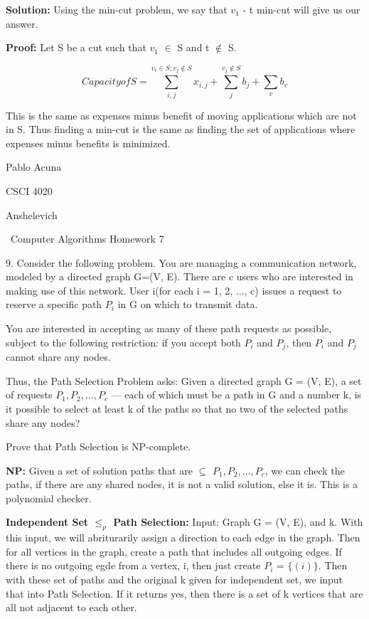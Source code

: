 \documentclass{article}
\begin{document}
\textbf{Solution:} Using the min-cut problem, we say that $v_1$ - t min-cut will give us
our answer.

\textbf{Proof:} Let S be a cut such that $v_1$ $\in$ S and t $\notin$ S.

 $$Capacity of S = \sum_{i,j}^{v_i \in S; v_j \notin S} x_{i,j}  +  \sum_{j}^{v_j \notin S} b_{j} + \sum_{v}^{} b_{v} $$


 This is the same as expenses minus benefit of moving applications which are not in S.
 Thus finding a min-cut is the same as finding the set of applications where
 expenses minus benefits is minimized.



\clearpage


Pablo Acuna

CSCI 4020

Anshelevich

{\centering\ Computer Algorithms Homework 7 \par}

9. Consider the following problem. You are managing a communication network,
modeled by a directed graph G=(V, E). There are c users who are interested in
making use of this network. User i(for each i = 1, 2, ..., c) issues a request
to reserve a specific path $P_i$ in G on which to transmit data.

You are interested in accepting as many of these path requests as possible, subject
to the following restriction: if you accept both $P_i$ and $P_j$, then $P_i$ and $P_j$ cannot
share any nodes.

Thus, the Path Selection Problem asks: Given a directed graph G = (V, E), a set
of requests $P_1, P_2,..., P_c$ — each of which must be a path in G and a number k, is it
possible to select at least k of the paths so that no two of the selected paths
share any nodes?

Prove that Path Selection is NP-complete.

\textbf{NP:} Given a set of solution paths that are $\subseteq$ $P_1, P_2,..., P_c$,
we can check the paths, if there are any shared nodes, it is not a valid solution,
else it is.  This is a polynomial checker.

\textbf{Independent Set $\leq_{p}$ Path Selection:} Input: Graph G = (V, E), and k.
With this input, we will abriturarily assign a direction to each edge in the graph.
Then for all vertices in the graph, create a path that includes all outgoing edges.
If there is no outgoing egde from a vertex, i,  then just create $P_i$ = $\{(i)\}$.  Then with these
set of paths and the original k given for independent set, we input that into Path Selection.
If it returns yes, then there is a set of k vertices that are all not adjacent to each other.
\end{document}
